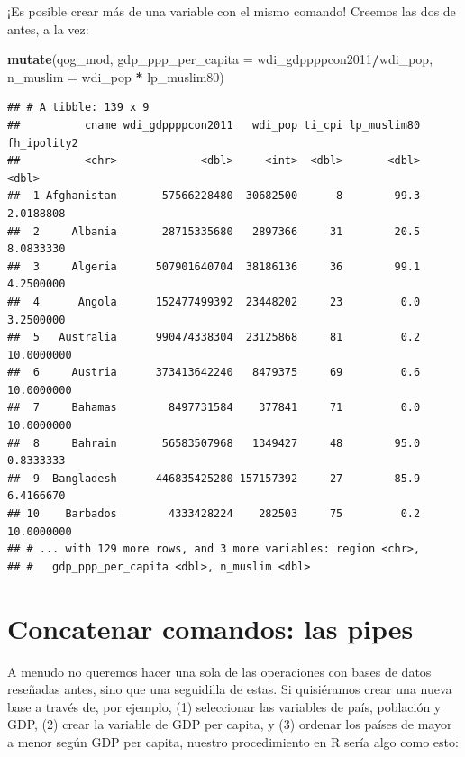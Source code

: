 \documentclass[]{book}
\newenvironment{Shaded}{\begin{snugshade}}{\end{snugshade}}
\newcommand{\KeywordTok}[1]{\textcolor[rgb]{0.13,0.29,0.53}{\textbf{#1}}}
\newcommand{\DataTypeTok}[1]{\textcolor[rgb]{0.13,0.29,0.53}{#1}}
\newcommand{\StringTok}[1]{\textcolor[rgb]{0.31,0.60,0.02}{#1}}
\newcommand{\OperatorTok}[1]{\textcolor[rgb]{0.81,0.36,0.00}{\textbf{#1}}}
\newcommand{\NormalTok}[1]{#1}
\begin{document}
¡Es posible crear más de una variable con el mismo comando! Creemos las
dos de antes, a la vez:

\begin{Shaded}
\begin{Highlighting}[]
\KeywordTok{mutate}\NormalTok{(qog_mod, }
       \DataTypeTok{gdp_ppp_per_capita =}\NormalTok{ wdi_gdppppcon2011}\OperatorTok{/}\NormalTok{wdi_pop,}
       \DataTypeTok{n_muslim           =}\NormalTok{ wdi_pop }\OperatorTok{*}\StringTok{ }\NormalTok{lp_muslim80)}
\end{Highlighting}
\end{Shaded}

\begin{verbatim}
## # A tibble: 139 x 9
##          cname wdi_gdppppcon2011   wdi_pop ti_cpi lp_muslim80 fh_ipolity2
##          <chr>             <dbl>     <int>  <dbl>       <dbl>       <dbl>
##  1 Afghanistan       57566228480  30682500      8        99.3   2.0188808
##  2     Albania       28715335680   2897366     31        20.5   8.0833330
##  3     Algeria      507901640704  38186136     36        99.1   4.2500000
##  4      Angola      152477499392  23448202     23         0.0   3.2500000
##  5   Australia      990474338304  23125868     81         0.2  10.0000000
##  6     Austria      373413642240   8479375     69         0.6  10.0000000
##  7     Bahamas        8497731584    377841     71         0.0  10.0000000
##  8     Bahrain       56583507968   1349427     48        95.0   0.8333333
##  9  Bangladesh      446835425280 157157392     27        85.9   6.4166670
## 10    Barbados        4333428224    282503     75         0.2  10.0000000
## # ... with 129 more rows, and 3 more variables: region <chr>,
## #   gdp_ppp_per_capita <dbl>, n_muslim <dbl>
\end{verbatim}

\section{Concatenar comandos: las
pipes}\label{concatenar-comandos-las-pipes}

A menudo no queremos hacer una sola de las operaciones con bases de
datos reseñadas antes, sino que una seguidilla de estas. Si quisiéramos
crear una nueva base a través de, por ejemplo, (1) seleccionar las
variables de país, población y GDP, (2) crear la variable de GDP per
capita, y (3) ordenar los países de mayor a menor según GDP per capita,
nuestro procedimiento en R sería algo como esto:
\end{document}
